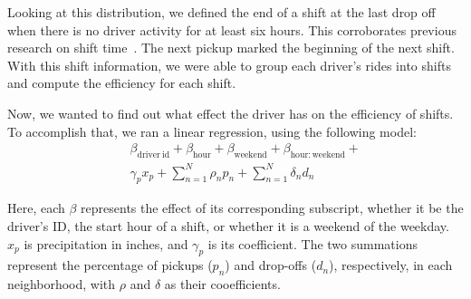 \documentclass[twocolumn]{article}
\begin{document}
Looking at this distribution, we defined the end of a shift at the last drop off when there is no driver activity for at least six hours. This corroborates previous research on shift time~\cite{Farber:2014}. The next pickup marked the beginning of the next shift. With this shift information, we were able to group each driver's rides into shifts and compute the efficiency for each shift.

Now, we wanted to find out what effect the driver has on the efficiency of shifts. To accomplish that, we ran a linear regression, using the following model: 
\begin{eqnarray*}
&& \beta_{\mathrm{driver~id}} + \beta_{\mathrm{hour}} + \beta_{\mathrm{weekend}} + \beta_{\mathrm{hour:weekend}} + \\
  & & \gamma_p x_p + \sum_{n=1}^N \rho_n p_n + \sum_{n=1}^N \delta_n d_n
\end{eqnarray*}

Here, each $\beta$ represents the effect of its corresponding subscript, whether it be the driver’s ID, the start hour of a shift, or whether it is a weekend of the weekday. $x_p$ is precipitation in inches, and  $\gamma_p$ is its coefficient. The two summations represent the percentage of pickups ($p_n$) and drop-offs ($d_n$), respectively, in each neighborhood, with $\rho$ and $\delta$ as their cooefficients.
\end{document}
